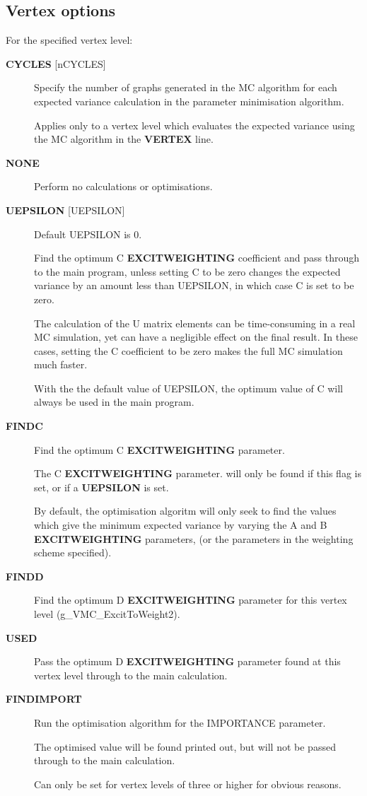 \documentclass[openany,a4paper,10pt]{manual}
\begin{document}
\subsection{Vertex options}

For the specified vertex level:
\begin{description}
\item[\textbf{CYCLES} {[}nCYCLES{]}]
Specify the number of graphs generated in the MC algorithm
for each expected variance calculation in the parameter minimisation algorithm.

Applies only to a vertex level which evaluates the expected variance
using the MC algorithm in the \textbf{VERTEX} line.

\item[\textbf{NONE}]
Perform no calculations or optimisations.

\item[\textbf{UEPSILON} {[}UEPSILON{]}]
Default UEPSILON is 0.

Find the  optimum C \textbf{EXCITWEIGHTING} coefficient and pass through to the main program,
unless setting C to be zero changes the expected variance by an amount less
than UEPSILON, in which case C is set to be zero.

The calculation of the U matrix elements can be time-consuming
in a real MC simulation, yet can have a negligible effect on the
final result.  In these cases, setting the C coefficient to be zero
makes the full MC simulation much faster.

With the the default value of UEPSILON, the optimum value of C will
always be used in the main program.

\item[\textbf{FINDC}]
Find the optimum C \textbf{EXCITWEIGHTING} parameter.

The C \textbf{EXCITWEIGHTING} parameter. will only be found if this
flag is set, or if a \textbf{UEPSILON} is set.

By default, the optimisation algoritm will only seek to find the
values which give the minimum expected variance by varying the A and
B \textbf{EXCITWEIGHTING} parameters, (or the parameters in the weighting
scheme specified).

\item[\textbf{FINDD}]
Find the optimum D \textbf{EXCITWEIGHTING} parameter for this vertex
level (g\_VMC\_ExcitToWeight2).

\item[\textbf{USED}]
Pass the optimum D \textbf{EXCITWEIGHTING} parameter found at this vertex level
through to the main calculation.

\item[\textbf{FINDIMPORT}]
Run the optimisation algorithm for the IMPORTANCE
parameter.

The optimised value will be found printed out,
but will not be passed through to the main calculation.

Can only be set for vertex levels of three or higher for
obvious reasons.

\end{description}
\end{document}
